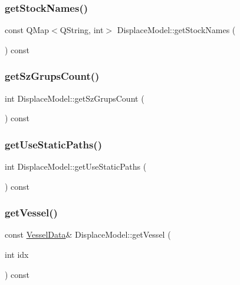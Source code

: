 \subsubsection{\texorpdfstring{getStockNames()}{getStockNames()}}
{\footnotesize\ttfamily const Q\+Map$<$Q\+String, int$>$ Displace\+Model\+::get\+Stock\+Names (\begin{DoxyParamCaption}{ }\end{DoxyParamCaption}) const\hspace{0.3cm}{\ttfamily [inline]}}

\mbox{\label{class_displace_model_a4724bde7911600c7e81895f81f57f76f}} 
\subsubsection{\texorpdfstring{getSzGrupsCount()}{getSzGrupsCount()}}
{\footnotesize\ttfamily int Displace\+Model\+::get\+Sz\+Grups\+Count (\begin{DoxyParamCaption}{ }\end{DoxyParamCaption}) const\hspace{0.3cm}{\ttfamily [inline]}}

\mbox{\label{class_displace_model_ab04195fc2d35729735bf0c7c4572ca57}} 
\subsubsection{\texorpdfstring{getUseStaticPaths()}{getUseStaticPaths()}}
{\footnotesize\ttfamily int Displace\+Model\+::get\+Use\+Static\+Paths (\begin{DoxyParamCaption}{ }\end{DoxyParamCaption}) const}

\mbox{\label{class_displace_model_a5ee657bbb24217f9a5a14f1320b0f454}} 
\subsubsection{\texorpdfstring{getVessel()}{getVessel()}}
{\footnotesize\ttfamily const \mbox{\hyperlink{class_vessel_data}{Vessel\+Data}}\& Displace\+Model\+::get\+Vessel (\begin{DoxyParamCaption}\item[{int}]{idx }\end{DoxyParamCaption}) const\hspace{0.3cm}{\ttfamily [inline]}}

